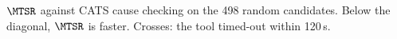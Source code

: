 \caption{$\MTSR$ against \textsc{CATS} cause checking on the 498
    random candidates. Below the diagonal, $\MTSR$ is faster.
    Crosses: the tool timed-out within 120\,s.}
  \label{fig:data-cats-check-time}
